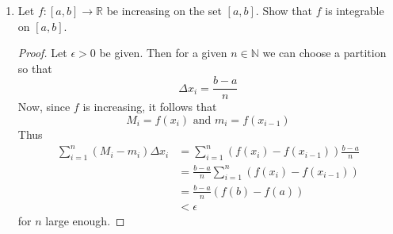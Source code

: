 \begin{enumerate}
    \begin{proof}
    First, since each \( f_n \) is integrable on \( [a,b] \), it follows that each \( f_n \) is bounded on \( [a,b] \). By Exercise 6.7.8 (c) and uniform convergence of \( f_n \) on \( [a,b] \), it follows that \( f \) is bounded on \( [a,b] \). So, let \( \epsilon > 0 \) be given. From our Lemma, we can choose \( N \) so that \( n \geq N \) will imply
    \begin{align*}
    \vert M^f - M^{f_n} \vert &< \frac{\epsilon}{3(b-a)}
    \intertext{and}
    \vert m^{f_n} - m^f \vert &< \frac{\epsilon}{3(b-a)}
    \end{align*}
    on any interval in \( [a,b] \). Furthermore, for any such \( n \), by integrability of \( f_n \) we can choose a partition \( P \) so that
    \[
    \sum_k^s (M_{k}^{f_n}-m_{k}^{f_n})\Delta x_k < \frac{\epsilon}{3}
    \]
    Thus
    \begin{align*}
        \sum_k^s (M_{k}^{f} - m_{k}^{f})\Delta x_k &\leq \sum_k^s \vert M_{k}^{f} - m_{k}^{f} \vert \Delta x_k \\
        &\leq \sum_k^s \vert M_{k}^{f} - M_{k}^{f_n} \vert \Delta x_k + \sum_k^s \vert M_{k}^{f_n}-m_{k}^{f_n} \vert \Delta x_k + \sum_k^s \vert m_{k}^{f_n}-m_{k}^{f} \vert \Delta x_k \\
        &< \frac{\epsilon}{3(b-a)}\sum_k^s \Delta x_k + \frac{\epsilon}{3} + \frac{\epsilon}{3(b-a)}\sum_k^s \Delta x_k \\
        &= \frac{\epsilon}{3} + \frac{\epsilon}{3} + \frac{\epsilon}{3} \\
        &= \epsilon
    \end{align*}
    implying that \( f \) is integrable on \( [a,b] \). 
    \end{proof}
    
    \item Let \( f:[a,b] \rightarrow \mathbb{R} \) be increasing on the set \( [a,b] \). Show that \( f \) is integrable on \( [a,b] \).
    
    \begin{proof}
    Let \( \epsilon > 0 \) be given. Then for a given \( n \in \mathbb{N} \) we can choose a partition so that
    \[
    \Delta x_i = \frac{b-a}{n}
    \]
    Now, since \( f \) is increasing, it follows that 
    \[
    M_i = f(x_i) \text{ and } m_i = f(x_{i-1})
    \]
    Thus
    \begin{align*}
        \sum_{i=1}^n (M_i - m_i)\Delta x_i &= \sum_{i=1}^n (f(x_i)-f(x_{i-1}))\frac{b-a}{n} \\
        &= \frac{b-a}{n}\sum_{i=1}^n (f(x_i)-f(x_{i-1})) \\
        &= \frac{b-a}{n}(f(b)-f(a)) \\
        &< \epsilon
    \end{align*}
    for \( n \) large enough.
    \end{proof}
\end{enumerate}